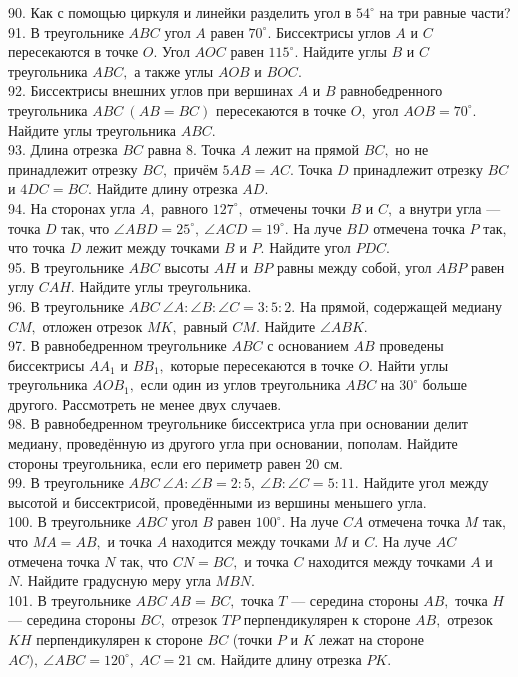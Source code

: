 90. Как с помощью циркуля и линейки разделить угол в $54^\circ$ на три равные части?\\
91. В треугольнике $ABC$ угол $A$ равен $70^\circ.$ Биссектрисы углов $A$ и $C$ пересекаются в точке $O.$ Угол $AOC$ равен $115^\circ.$ Найдите углы $B$ и $C$ треугольника $ABC,$ а также углы $AOB$ и $BOC.$\\
92. Биссектрисы внешних углов при вершинах $A$ и $B$ равнобедренного треугольника $ABC\ (AB=BC)$ пересекаются в точке $O,$ угол $AOB=70^\circ.$ Найдите углы треугольника $ABC.$\\
93. Длина отрезка $BC$ равна 8. Точка $A$ лежит на прямой $BC,$ но не принадлежит отрезку $BC,$ причём $5AB=AC.$ Точка $D$ принадлежит отрезку $BC$ и $4DC=BC.$ Найдите длину отрезка $AD.$\\
94. На сторонах угла $A,$ равного $127^\circ,$ отмечены точки $B$ и $C,$ а внутри угла --- точка $D$ так, что $\angle ABD=25^\circ,\ \angle ACD=19^\circ.$ На луче $BD$ отмечена точка $P$ так, что точка $D$ лежит между точками $B$ и $P.$ Найдите угол $PDC.$\\
95. В треугольнике $ABC$ высоты $AH$ и $BP$ равны между собой, угол $ABP$ равен углу $CAH.$ Найдите углы треугольника.\\
96. В треугольнике $ABC\ \angle A: \angle B: \angle C=3:5:2.$ На прямой, содержащей медиану $CM,$ отложен отрезок $MK,$ равный $CM.$ Найдите $\angle ABK.$\\
97. В равнобедренном треугольнике $ABC$ с основанием $AB$ проведены биссектрисы $AA_1$ и $BB_1,$ которые пересекаются в точке $O.$ Найти углы треугольника $AOB_1,$ если один из углов треугольника $ABC$ на $30^\circ$ больше другого. Рассмотреть не менее двух случаев.\\
98. В равнобедренном треугольнике биссектриса угла при основании делит медиану, проведённую из другого угла при основании, пополам. Найдите стороны треугольника, если его периметр равен 20 см.\\
99. В треугольнике $ABC\ \angle A: \angle B=2:5,\ \angle B: \angle C=5:11.$ Найдите угол между высотой и биссектрисой, проведёнными из вершины меньшего угла.\\
100. В треугольнике $ABC$ угол $B$ равен $100^\circ.$ На луче $CA$ отмечена точка $M$ так, что $MA=AB,$ и точка $A$ находится между точками $M$ и $C.$ На луче $AC$ отмечена точка $N$ так, что $CN=BC,$ и точка $C$ находится между точками $A$ и $N.$ Найдите градусную меру угла $MBN.$\\
101. В треугольнике $ABC\ AB=BC,$ точка $T$ --- середина стороны $AB,$ точка $H$ --- середина стороны $BC,$ отрезок $TP$ перпендикулярен к стороне $AB,$ отрезок $KH$ перпендикулярен к стороне $BC$ (точки $P$ и $K$ лежат на стороне $AC),\ \angle ABC=120^\circ,\ AC=21$ см. Найдите длину отрезка $PK.$\\
